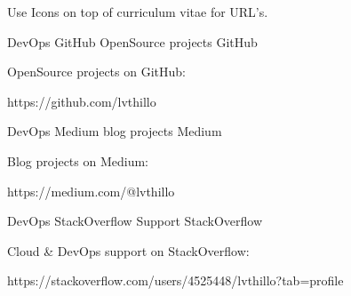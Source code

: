 

\begin{cventries}

  \cventry
    {Use Icons on top of curriculum vitae for URL's.}
    {} %
    {} %
    {} %
    {}

  \cventry
    {DevOps} %
    {GitHub OpenSource projects} %
    {GitHub} %
    {} %
    {
      \begin{cvitems} %
        \item {OpenSource projects on GitHub:}
        \item {https://github.com/lvthillo}
      \end{cvitems}
    }

  \cventry
    {DevOps} %
    {Medium blog projects} %
    {Medium} %
    {} %
    {
      \begin{cvitems} %
        \item {Blog projects on Medium:}
        \item {https://medium.com/@lvthillo}
      \end{cvitems}
    }

  \cventry
    {DevOps} %
    {StackOverflow Support} %
    {StackOverflow} %
    {} %
    {
      \begin{cvitems} %
        \item {Cloud \& DevOps support on StackOverflow:}
        \item {https://stackoverflow.com/users/4525448/lvthillo?tab=profile}
      \end{cvitems}
    }

\end{cventries}
